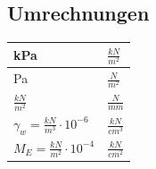 \begin{minipage}[t]{0.25\linewidth}	
	\subsection{Umrechnungen}
	\begin{tabular}{|l|l|}
	\hline
	kPa 				& $\frac{kN}{m^2}$ \\ \hline
	Pa					& $\frac{N}{m^2}$  \\ \hline
	$\frac{kN}{m^2}$	& $\frac{N}{mm}$	\\ \hline
	$\gamma_w=\frac{kN}{m^3}\cdot 10^{-6}$ & $\frac{kN}{cm^3}$ \\ \hline
	$M_E=\frac{kN}{m^2}\cdot 10^{-4}$ & $\frac{kN}{cm^2}$	\\ \hline
	\end{tabular}
\end{minipage}
